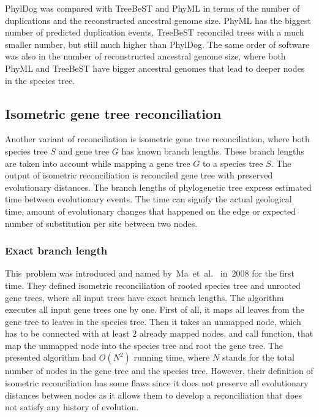 PhylDog was compared with TreeBeST and PhyML \cite{phyldog} in terms of the number of duplications and the reconstructed ancestral genome size. PhyML has the biggest number of predicted duplication events, TreeBeST reconciled trees with a much smaller number, but still much higher than PhylDog. The same order of software was also in the number of reconstructed ancestral genome size, where both PhyML and TreeBeST have bigger ancestral genomes that lead to deeper nodes in the species tree.

\subsection{Isometric gene tree reconciliation}
Another variant of reconciliation is isometric gene tree reconciliation, where both species tree $S$ and gene tree $G$ has known branch lengths. These branch lengths are taken into account while mapping a gene tree $G$ to a species tree $S$. The output of isometric reconciliation is reconciled gene tree with preserved evolutionary distances. The branch lengths of phylogenetic tree express estimated time between evolutionary events. The time can signify the actual geological time, amount of evolutionary changes that happened on the edge or expected number of substitution per site between two nodes.

\subsubsection{Exact branch length}

This~problem was introduced and named by~Ma~et~al.~\cite{ma} in~2008 for the first time. They defined isometric reconciliation of rooted species tree and unrooted gene trees, where all input trees have exact branch lengths. The algorithm executes all input gene trees one by one. First of all, it maps all leaves from the gene tree to leaves in the species tree. Then it takes an unmapped node, which has to be connected with at least 2 already mapped nodes, and call function, that map the unmapped node into the species tree and root the gene tree. The presented algorithm had $O(N^2)$ running time, where $N$ stands for the total number of nodes in the gene tree and the species tree. However, their definition of isometric reconciliation has some flaws since it does not preserve all evolutionary distances between nodes as it allows them to develop a reconciliation that does not satisfy any history of evolution.

